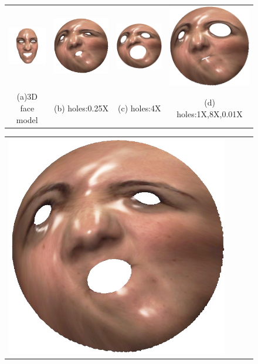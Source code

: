 \documentclass[runningheads]{llncs}
\begin{document}
{ \setlength{\tabcolsep}{0pt}
\begin{figure}[!htbp]
\centering
\begin{tabular}{cccc}
\includegraphics[height=0.25\textwidth]{./figs/roi_face/face_a.jpg}&
\includegraphics[height=0.25\textwidth]{./figs/roi_face/face_b.jpg}&
\includegraphics[height=0.25\textwidth]{./figs/roi_face/face_c.jpg}&
\includegraphics[height=0.25\textwidth]{./figs/roi_face/face_d.jpg}\\
(a)3D face model&(b) holes:0.25X &(c) holes:4X &(d) holes:1X,8X,0.01X \\
\end{tabular}
\begin{tabular}{cccc}
\includegraphics[height=0.25\textwidth]{./figs/roi_face/face_e.jpg}&

\end{tabular}
\end{figure}}
\end{document}
